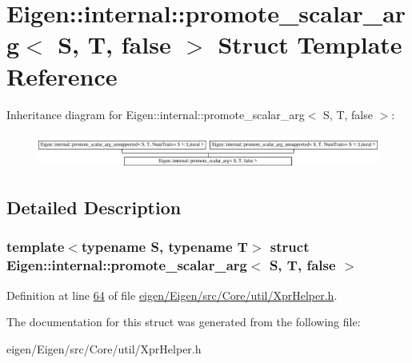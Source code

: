 \hypertarget{struct_eigen_1_1internal_1_1promote__scalar__arg_3_01_s_00_01_t_00_01false_01_4}{}\section{Eigen\+:\+:internal\+:\+:promote\+\_\+scalar\+\_\+arg$<$ S, T, false $>$ Struct Template Reference}
\label{struct_eigen_1_1internal_1_1promote__scalar__arg_3_01_s_00_01_t_00_01false_01_4}
Inheritance diagram for Eigen\+:\+:internal\+:\+:promote\+\_\+scalar\+\_\+arg$<$ S, T, false $>$\+:\begin{figure}[H]
\begin{center}
\leavevmode
\includegraphics[height=1.161826cm]{struct_eigen_1_1internal_1_1promote__scalar__arg_3_01_s_00_01_t_00_01false_01_4}
\end{center}
\end{figure}


\subsection{Detailed Description}
\subsubsection*{template$<$typename S, typename T$>$\newline
struct Eigen\+::internal\+::promote\+\_\+scalar\+\_\+arg$<$ S, T, false $>$}



Definition at line \hyperlink{eigen_2_eigen_2src_2_core_2util_2_xpr_helper_8h_source_l00064}{64} of file \hyperlink{eigen_2_eigen_2src_2_core_2util_2_xpr_helper_8h_source}{eigen/\+Eigen/src/\+Core/util/\+Xpr\+Helper.\+h}.



The documentation for this struct was generated from the following file\+:\begin{DoxyCompactItemize}
\item 
eigen/\+Eigen/src/\+Core/util/\+Xpr\+Helper.\+h\end{DoxyCompactItemize}
